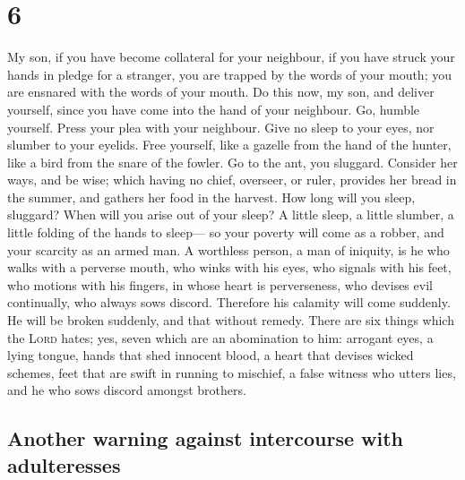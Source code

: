 \hypertarget{section-5}{%
\section{6}\label{section-5}}

 My son, if you have become collateral for your neighbour,
if you have struck your hands in pledge for a stranger, 
you are trapped by the words of your mouth; you are ensnared with the
words of your mouth.  Do this now, my son, and deliver
yourself, since you have come into the hand of your neighbour. Go,
humble yourself. Press your plea with your neighbour. 
Give no sleep to your eyes, nor slumber to your eyelids. 
Free yourself, like a gazelle from the hand of the hunter, like a bird
from the snare of the fowler.  Go to the ant, you
sluggard. Consider her ways, and be wise;  which having no
chief, overseer, or ruler,  provides her bread in the
summer, and gathers her food in the harvest.  How long
will you sleep, sluggard? When will you arise out of your sleep?
 A little sleep, a little slumber, a little folding of
the hands to sleep---  so your poverty will come as a
robber, and your scarcity as an armed man.  A worthless
person, a man of iniquity, is he who walks with a perverse mouth,
 who winks with his eyes, who signals with his feet, who
motions with his fingers,  in whose heart is
perverseness, who devises evil continually, who always sows discord.
 Therefore his calamity will come suddenly. He will be
broken suddenly, and that without remedy.  There are six
things which the \textsc{Lord} hates; yes, seven which are an
abomination to him:  arrogant eyes, a lying tongue, hands
that shed innocent blood,  a heart that devises wicked
schemes, feet that are swift in running to mischief,  a
false witness who utters lies, and he who sows discord amongst brothers.

\hypertarget{another-warning-against-intercourse-with-adulteresses}{%
\subsection{Another warning against intercourse with
adulteresses}\label{another-warning-against-intercourse-with-adulteresses}}

